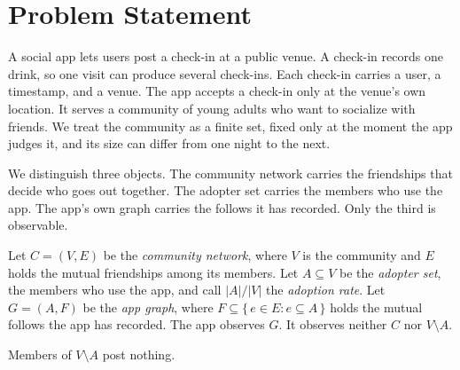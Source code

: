 \section{Problem Statement}


A social app lets users post a check-in at a public venue. A check-in records one drink, so one
visit can produce several check-ins. Each check-in carries a user, a timestamp, and a venue. The
app accepts a check-in only at the venue's own location. It serves a community of young adults
who want to socialize with friends. We treat the community as a finite set, fixed only at the
moment the app judges it, and its size can differ from one night to the next.

We distinguish three objects. The community network carries the friendships that decide who goes
out together. The adopter set carries the members who use the app. The app's own graph carries
the follows it has recorded. Only the third is observable.

\begin{definition}
Let $C = (V, E)$ be the \emph{community network}, where $V$ is the community and $E$ holds the
mutual friendships among its members. Let $A \subseteq V$ be the \emph{adopter set}, the members
who use the app, and call $|A| / |V|$ the \emph{adoption rate}. Let $G = (A, F)$ be the
\emph{app graph}, where $F \subseteq \{\, e \in E : e \subseteq A \,\}$ holds the mutual follows
the app has recorded. The app observes $G$. It observes neither $C$ nor $V \setminus A$.
\end{definition}

\begin{assumption}
Members of $V \setminus A$ post nothing.
\end{assumption}

